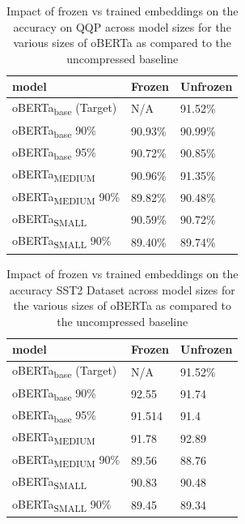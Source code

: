 \begin{table}[!htb]
    \centering
    \begin{tabular}{|l|l|l|}
    \hline
        model & Frozen & Unfrozen \\ \hline
        oBERTa\textsubscript{base} (Target) & N/A & 91.52\% \\ \hline
        oBERTa\textsubscript{base} 90\% & 90.93\% & 90.99\% \\ \hline
        oBERTa\textsubscript{base} 95\% & 90.72\% & 90.85\% \\ \hline
        oBERTa\textsubscript{MEDIUM} & 90.96\% & 91.35\% \\ \hline
        oBERTa\textsubscript{MEDIUM} 90\% & 89.82\% & 90.48\% \\ \hline
        oBERTa\textsubscript{SMALL} & 90.59\% & 90.72\% \\ \hline
        oBERTa\textsubscript{SMALL} 90\% & 89.40\% & 89.74\% \\ \hline
    \end{tabular}
    \caption{Impact of frozen vs trained embeddings on the accuracy on QQP across model sizes for the various sizes of oBERTa as compared to the uncompressed baseline}
    \label{tab:qqp-freeze}
\end{table}
\begin{table}[!ht]
    \centering
    \begin{tabular}{|l|l|l|}
    \hline
    model & Frozen & Unfrozen \\ \hline   
    oBERTa\textsubscript{base} (Target) & N/A & 91.52\% \\ \hline
        oBERTa\textsubscript{base} 90\% & 92.55 & 91.74\\ \hline
        oBERTa\textsubscript{base} 95\% & 91.514 & 91.4 \\ \hline
        oBERTa\textsubscript{MEDIUM} & 91.78 & 92.89 \\ \hline
        oBERTa\textsubscript{MEDIUM} 90\% & 89.56 & 88.76 \\ \hline
        oBERTa\textsubscript{SMALL} & 90.83 & 90.48 \\ \hline
        oBERTa\textsubscript{SMALL} 90\% & 89.45 & 89.34 \\ \hline    
    \end{tabular}
    \caption{Impact of frozen vs trained embeddings on the accuracy SST2 Dataset across model sizes for the various sizes of oBERTa as compared to the uncompressed baseline}
    \label{tab:sst2-freeze}
\end{table}

